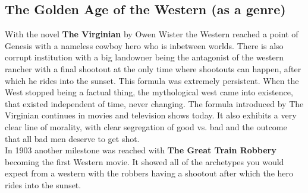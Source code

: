 \documentclass{article}
\begin{document}
	\subsection{The Golden Age of the Western (as a genre)}
	With the novel \textbf{The Virginian} by Owen Wister the Western reached a point of Genesis with a nameless cowboy hero who is inbetween worlds. There is also corrupt institution with a big landowner being the antagonist of the western rancher with a final shootout at the only time where shootouts can happen, after which he rides into the sunset. This formula was extremely persistent. When the West stopped being a factual thing, the mythological west came into existence, that existed independent of time, never changing. The formula introduced by The Virginian continues in movies and television shows today. It also exhibits a very clear line of morality, with clear segregation of good vs. bad and the outcome that all bad men deserve to get shot. \\
	In 1903 another milestone was reached with \textbf{The Great Train Robbery} becoming the first Western movie. It showed all of the archetypes you would expect from a western with the robbers having a shootout after which the hero rides into the sunset. \\
\end{document}
